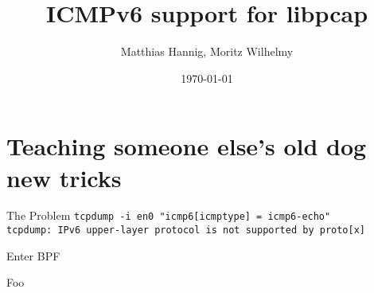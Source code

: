 \documentclass{beamer}
\title{ICMPv6 support for libpcap}
\date{\today}
\author{Matthias Hannig, Moritz Wilhelmy}
\institute{RIPE NCC IPv6 Hackathon Copenhagen}
\begin{document}
  \maketitle
  \section{Teaching someone else's old dog new tricks}
  \begin{frame}{The Problem}
    \texttt{tcpdump -i en0 "icmp6[icmptype] = icmp6-echo"}\\
    \texttt{tcpdump: IPv6 upper-layer protocol is not supported by proto[x]}
  \end{frame}

  \begin{frame}{Enter BPF}

  \end{frame}

  \begin{frame}{Foo}

  \end{frame}
\end{document}
